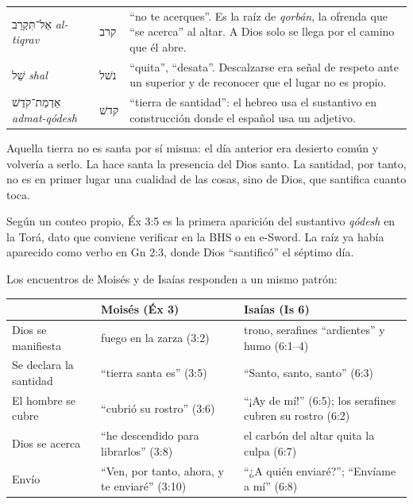 \documentclass[11pt,letterpaper]{article}
\newcommand{\heb}[1]{\mbox{\foreignlanguage{hebrew}{#1}}}
\begin{document}
\begin{filologia}[Éx 3:5]
\begin{tabular}{@{}L{3.2cm}L{1.6cm}L{10cm}@{}}
\heb{אַל־תִּקְרַב} \emph{al-tiqrav} & \heb{קרב} & ``no te acerques''. Es la raíz de \emph{qorbán}, la ofrenda que ``se acerca'' al altar. A Dios solo se llega por el camino que él abre. \\[2pt]
\heb{שַׁל} \emph{shal} & \heb{נשׁל} & ``quita'', ``desata''. Descalzarse era señal de respeto ante un superior y de reconocer que el lugar no es propio. \\[2pt]
\heb{אַדְמַת־קֹדֶשׁ} \emph{admat-qódesh} & \heb{קדשׁ} & ``tierra de santidad'': el hebreo usa el sustantivo en construcción donde el español usa un adjetivo. \\
\end{tabular}
\end{filologia}

Aquella tierra no es santa por sí misma: el día anterior era desierto común y volvería a serlo. La hace santa la presencia del Dios santo. La santidad, por tanto, no es en primer lugar una cualidad de las cosas, sino de Dios, que santifica cuanto toca.

\begin{nota}[Precisión]
Según un conteo propio, Éx 3:5 es la primera aparición del sustantivo \emph{qódesh} en la Torá, dato que conviene verificar en la BHS o en e-Sword. La raíz ya había aparecido como verbo en Gn 2:3, donde Dios ``santificó'' el séptimo día.
\end{nota}

Los encuentros de Moisés y de Isaías responden a un mismo patrón:

\begin{center}\small\renewcommand{\arraystretch}{1.3}
\begin{tabular}{@{}L{3.0cm}L{5.6cm}L{5.6cm}@{}}
\toprule
& \textbf{Moisés (Éx 3)} & \textbf{Isaías (Is 6)} \\ \midrule
Dios se manifiesta & fuego en la zarza (3:2) & trono, serafines ``ardientes'' y humo (6:1--4) \\
Se declara la santidad & ``tierra santa es'' (3:5) & ``Santo, santo, santo'' (6:3) \\
El hombre se cubre & ``cubrió su rostro'' (3:6) & ``¡Ay de mí!'' (6:5); los serafines cubren su rostro (6:2) \\
Dios se acerca & ``he descendido para librarlos'' (3:8) & el carbón del altar quita la culpa (6:7) \\
Envío & ``Ven, por tanto, ahora, y te enviaré'' (3:10) & ``¿A quién enviaré?''; ``Envíame a mí'' (6:8) \\
\bottomrule
\end{tabular}\end{center}
\end{document}
